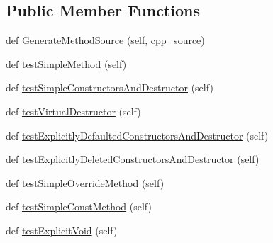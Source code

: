 \subsection*{Public Member Functions}
\begin{DoxyCompactItemize}
\item 
def \mbox{\hyperlink{classgoogletest-master_1_1googlemock_1_1scripts_1_1generator_1_1cpp_1_1gmock__class__test_1_1_generate_methods_test_a4ce3cb282700e6169589a278bf879c74}{Generate\+Method\+Source}} (self, cpp\+\_\+source)
\item 
def \mbox{\hyperlink{classgoogletest-master_1_1googlemock_1_1scripts_1_1generator_1_1cpp_1_1gmock__class__test_1_1_generate_methods_test_af75221991e2f8ad3f3f023e14e533c65}{test\+Simple\+Method}} (self)
\item 
def \mbox{\hyperlink{classgoogletest-master_1_1googlemock_1_1scripts_1_1generator_1_1cpp_1_1gmock__class__test_1_1_generate_methods_test_a14f225e045d4f93214f6a475c3b9d044}{test\+Simple\+Constructors\+And\+Destructor}} (self)
\item 
def \mbox{\hyperlink{classgoogletest-master_1_1googlemock_1_1scripts_1_1generator_1_1cpp_1_1gmock__class__test_1_1_generate_methods_test_a1b1c2224e7a802e42b4b452a3b678989}{test\+Virtual\+Destructor}} (self)
\item 
def \mbox{\hyperlink{classgoogletest-master_1_1googlemock_1_1scripts_1_1generator_1_1cpp_1_1gmock__class__test_1_1_generate_methods_test_ac4c76e0dc2b59bfc4dc203d886ca99b0}{test\+Explicitly\+Defaulted\+Constructors\+And\+Destructor}} (self)
\item 
def \mbox{\hyperlink{classgoogletest-master_1_1googlemock_1_1scripts_1_1generator_1_1cpp_1_1gmock__class__test_1_1_generate_methods_test_a11970fbede4e3048ebe7d5cd0f5854f1}{test\+Explicitly\+Deleted\+Constructors\+And\+Destructor}} (self)
\item 
def \mbox{\hyperlink{classgoogletest-master_1_1googlemock_1_1scripts_1_1generator_1_1cpp_1_1gmock__class__test_1_1_generate_methods_test_a15e0d3394c14da27746245b828d2d9e0}{test\+Simple\+Override\+Method}} (self)
\item 
def \mbox{\hyperlink{classgoogletest-master_1_1googlemock_1_1scripts_1_1generator_1_1cpp_1_1gmock__class__test_1_1_generate_methods_test_a9ead371d18df42278bd9a0747a457cfb}{test\+Simple\+Const\+Method}} (self)
\item 
def \mbox{\hyperlink{classgoogletest-master_1_1googlemock_1_1scripts_1_1generator_1_1cpp_1_1gmock__class__test_1_1_generate_methods_test_ae199744ea1259c97155661a66fb20945}{test\+Explicit\+Void}} (self)

\end{DoxyCompactItemize}
